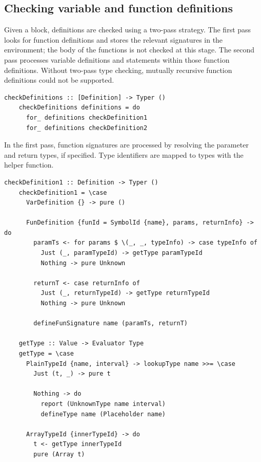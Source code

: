 \documentclass[UdineBachThesis,american,11pt]{PhdThesis}
\begin{document}
  \newpage

  \subsection{Checking variable and function definitions}

  Given a block, definitions are checked using a two-pass strategy. The first
  pass looks for function definitions and stores the relevant signatures in the
  environment; the body of the functions is not checked at this stage. The
  second pass processes variable definitions and statements within those
  function definitions. Without two-pass type checking, mutually recursive
  function definitions could not be supported.

  \begin{lstlisting}[gobble=4,basicstyle=\ttfamily\small]
    checkDefinitions :: [Definition] -> Typer ()
    checkDefinitions definitions = do
      for_ definitions checkDefinition1
      for_ definitions checkDefinition2
  \end{lstlisting}

  In the first pass, function signatures are processed by resolving the
  parameter and return types, if specified. Type identifiers are mapped to types
  with the \lstinline@getType@ helper function.

  \begin{lstlisting}[gobble=4,basicstyle=\ttfamily\small]
    checkDefinition1 :: Definition -> Typer ()
    checkDefinition1 = \case
      VarDefinition {} -> pure ()

      FunDefinition {funId = SymbolId {name}, params, returnInfo} -> do
        paramTs <- for params $ \(_, _, typeInfo) -> case typeInfo of
          Just (_, paramTypeId) -> getType paramTypeId
          Nothing -> pure Unknown

        returnT <- case returnInfo of
          Just (_, returnTypeId) -> getType returnTypeId
          Nothing -> pure Unknown

        defineFunSignature name (paramTs, returnT)

    getType :: Value -> Evaluator Type
    getType = \case
      PlainTypeId {name, interval} -> lookupType name >>= \case
        Just (t, _) -> pure t

        Nothing -> do
          report (UnknownType name interval)
          defineType name (Placeholder name)

      ArrayTypeId {innerTypeId} -> do
        t <- getType innerTypeId
        pure (Array t)
  \end{lstlisting}
\end{document}
